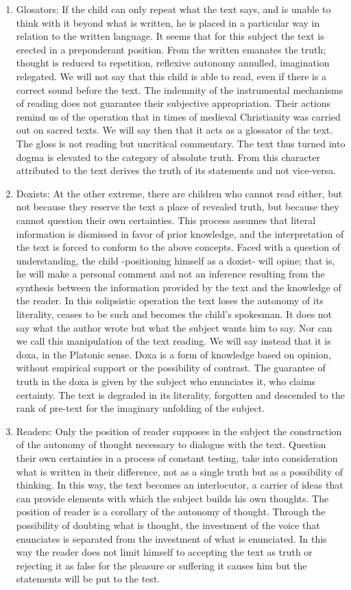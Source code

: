 \documentclass[english]{textolivre}
\begin{document}
\begin{enumerate}[label=\alph*.]
    \item Glosators: If the child can only repeat what the text says, and is unable to think with it beyond what is written, he is placed in a particular way in relation to the written language. It seems that for this subject the text is erected in a preponderant position. From the written emanates the truth; thought is reduced to repetition, reflexive autonomy annulled, imagination relegated. We will not say that this child is able to read, even if there is a correct sound before the text. The indemnity of the instrumental mechanisms of reading does not guarantee their subjective appropriation. Their actions remind us of the operation that in times of medieval Christianity was carried out on sacred texts. We will say then that it acts as a glossator of the text. The gloss is not reading but uncritical commentary. The text thus turned into dogma is elevated to the category of absolute truth. From this character attributed to the text derives the truth of its statements and not vice-versa.
    \item Doxists: At the other extreme, there are children who cannot read either, but not because they reserve the text a place of revealed truth, but because they cannot question their own certainties. This process assumes that literal information is dismissed in favor of prior knowledge, and the interpretation of the text is forced to conform to the above concepts. Faced with a question of understanding, the child -positioning himself as a doxist- will opine; that is, he will make a personal comment and not an inference resulting from the synthesis between the information provided by the text and the knowledge of the reader. In this solipsistic operation the text loses the autonomy of its literality, ceases to be such and becomes the child's spokesman. It does not say what the author wrote but what the subject wants him to say. Nor can we call this manipulation of the text reading. We will say instead that it is doxa, in the Platonic sense. Doxa is a form of knowledge based on opinion, without empirical support or the possibility of contrast. The guarantee of truth in the doxa is given by the subject who enunciates it, who claims certainty. The text is degraded in its literality, forgotten and descended to the rank of pre-text for the imaginary unfolding of the subject.
    \item Readers: Only the position of reader supposes in the subject the construction of the autonomy of thought necessary to dialogue with the text. Question their own certainties in a process of constant testing, take into consideration what is written in their difference, not as a single truth but as a possibility of thinking. In this way, the text becomes an interlocutor, a carrier of ideas that can provide elements with which the subject builds his own thoughts. The position of reader is a corollary of the autonomy of thought. Through the possibility of doubting what is thought, the investment of the voice that enunciates is separated from the investment of what is enunciated. In this way the reader does not limit himself to accepting the text as truth or rejecting it as false for the pleasure or suffering it causes him but the statements will be put to the test.

\end{enumerate}
\end{document}
